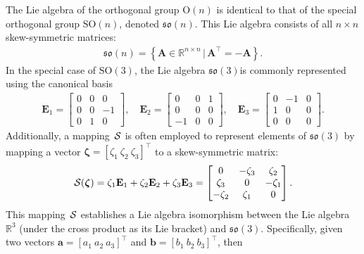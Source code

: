 \begin{example}\label{ex:orthogonal-group-special-orthogonal-group-lie-algebra}
    The Lie algebra of the orthogonal group $\text{O}(n)$  is identical to that of the special orthogonal group $\text{SO}(n)$, denoted $\mathfrak{so}(n)$. This Lie algebra consists of all $n\times n$ skew-symmetric matrices:
    \begin{align*}
        \mathfrak{so}(n) = \left\{\mathbf{A}\in\mathbb{R}^{n\times n} \,|\, \mathbf{A}^\top = -\mathbf{A}\right\}.
    \end{align*}
    In the special case of $\text{SO}(3)$, the Lie algebra $\mathfrak{so}(3)$is commonly represented using the canonical basis
    \begin{align*}
        \mathbf{E}_1 = \begin{bmatrix} 0 & 0 & 0 \\ 0 & 0 & -1 \\ 0 & 1 & 0 \end{bmatrix}, \quad \mathbf{E}_2 = \begin{bmatrix} 0 & 0 & 1 \\ 0 & 0 & 0 \\ -1 & 0 & 0 \end{bmatrix}, \quad \mathbf{E}_3 = \begin{bmatrix} 0 & -1 & 0 \\ 1 & 0 & 0 \\ 0 & 0 & 0 \end{bmatrix}.
    \end{align*}
    Additionally, a mapping $\SL$ is often employed to represent elements of $\mathfrak{so}(3)$ by mapping a vector $\boldsymbol{\zeta} = [\zeta_1\ \zeta_2\ \zeta_3]^\top$ to a skew-symmetric matrix:
    \begin{align*}
        \SL[\boldsymbol{\zeta}] = \zeta_1 \mathbf{E}_1 + \zeta_2 \mathbf{E}_2 + \zeta_3 \mathbf{E}_3
        = \begin{bmatrix} 0 & -\zeta_3 & \zeta_2 \\ \zeta_3 & 0 & -\zeta_1 \\ -\zeta_2 & \zeta_1 & 0 \end{bmatrix}.
    \end{align*}
    This mapping $\SL$ establishes a Lie algebra isomorphism between the Lie algebra $\mathbb{R}^3$ (under the cross product as its Lie bracket) and $\mathfrak{so}(3)$. Specifically, given two vectors $\mathbf{a} = [a_1\ a_2\ a_3]^\top$ and $\mathbf{b} = [b_1\ b_2\ b_3]^\top$, then 
    \begin{align*}

\end{align*}
\end{example}
